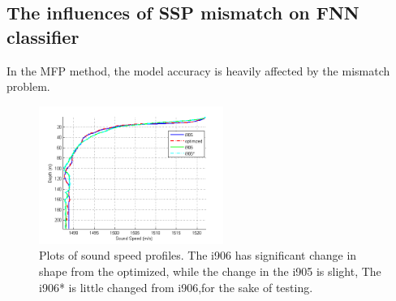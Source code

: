 \subsection{The influences of SSP mismatch on FNN classifier}
In the MFP method, the model accuracy is heavily affected by the mismatch problem\cite{tolstoy1989sensitivity,feuillade1989environmental,del1988effects}. 
\begin{figure}
\includegraphics[width=6cm]{figure/ssp4}
\caption{Plots of sound speed profiles. The i906 has significant change in shape from the optimized, while the change in the i905 is slight, The i906{*} is little changed from i906,for the sake of testing.}
\end{figure}
